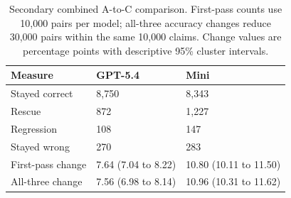 \begin{table}[htbp]\centering\small
\caption{Secondary combined A-to-C comparison. First-pass counts use 10,000 pairs per model; all-three accuracy changes reduce 30,000 pairs within the same 10,000 claims. Change values are percentage points with descriptive 95\% cluster intervals.}\label{tab:secondary}
\begin{tabularx}{\linewidth}{lXX}\toprule
Measure & GPT-5.4 & Mini \\\midrule
Stayed correct & 8,750 & 8,343 \\
Rescue & 872 & 1,227 \\
Regression & 108 & 147 \\
Stayed wrong & 270 & 283 \\
First-pass change & 7.64 (7.04 to 8.22) & 10.80 (10.11 to 11.50) \\
All-three change & 7.56 (6.98 to 8.14) & 10.96 (10.31 to 11.62) \\
\bottomrule
\end{tabularx}
\end{table}